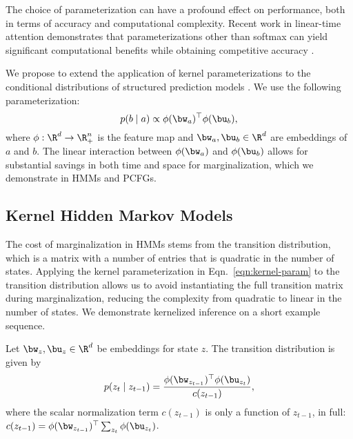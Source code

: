 
The choice of parameterization can have a profound effect on performance, both in terms of accuracy and computational complexity. Recent work in linear-time attention demonstrates that parameterizations other than softmax can yield significant computational benefits while obtaining competitive accuracy \citep{choromanski2020performer,katharopoulos2020lineartransformer,peng2021rfa,shen2018linearattn}. 

We propose to extend the application of kernel parameterizations to the conditional distributions of structured prediction models \citep{song2011kernelbp}.
We use the following parameterization:
\begin{equation}
    \label{eqn:kernel-param}
    p(b \mid a) \propto \phi(\bw_a)^\top\phi(\bu_b),
\end{equation}
where $\phi: \R^d \to \R^n_+$ is the feature map and $\bw_a,\bu_b\in\R^d$ are embeddings of $a$ and $b$.
The linear interaction between $\phi(\bw_a)$ and $\phi(\bu_b)$ allows for substantial savings in both time and space for marginalization, which we demonstrate in HMMs and PCFGs.

\subsection*{Kernel Hidden Markov Models}
The cost of marginalization in HMMs stems from the transition distribution, which is a matrix with a number of entries that is quadratic in the number of states.
Applying the kernel parameterization in Eqn.~\ref{eqn:kernel-param} to the transition distribution allows us to avoid instantiating the full transition matrix during marginalization, reducing the complexity from quadratic to linear in the number of states. We demonstrate kernelized inference on a short example sequence.

Let $\bw_z,\bu_z\in\R^d$ be embeddings for state $z$. The transition distribution is given by
\begin{equation}
p(z_t \mid z_{t-1})
= \frac{\phi(\bw_{z_{t-1}})^\top\phi(\bu_{z_t})}{c(z_{t-1})},
\end{equation}
where the scalar normalization term $c(z_{t-1})$ is only a function of $z_{t-1}$, in full:
$c(z_{t-1}) =\phi(\bw_{z_{t-1}})^\top \sum_{z_t}\phi(\bu_{z_{t}})$.

